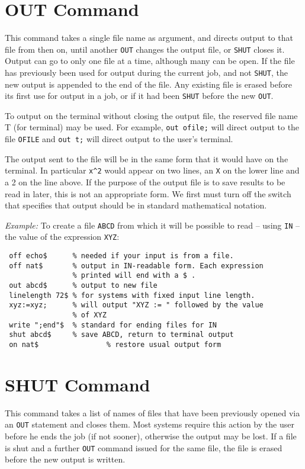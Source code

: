 \section{OUT Command}
\hypertarget{command:OUT}{}
This command takes a single file name as argument, and directs output to
that file from then on, until another \texttt{OUT} changes the output file,
or \texttt{SHUT} closes it.  Output can go to only one file at a time,
although many can be open.  If the file has previously been used for
output during the current job, and not \texttt{SHUT}, the new
output is appended to the end of the file.  Any existing file is erased
before its first use for output in a job, or if it had been \texttt{SHUT}
before the new \texttt{OUT}.

To output on the terminal without closing the output file, the reserved
file name T (for terminal) may be used.  For example,
\texttt{out ofile;} will direct output to the file \texttt{OFILE} and
\texttt{out t;} will direct output to the user's terminal.

The output sent to the file will be in the same form that it would have on
the terminal.  In particular \texttt{x\textasciicircum 2} would appear 
on two lines, an
\texttt{X} on the lower line and a 2 on the line above.  If the purpose of the
output file is to save results to be read in later, this is not an
appropriate form.  We first must turn off the  switch that
specifies that output should be in standard mathematical notation.

\textit{Example:} To create a file \texttt{ABCD} from which it will be possible
to read -- using \texttt{IN} -- the value of the expression \texttt{XYZ}:
\begin{verbatim}
 off echo$      % needed if your input is from a file.
 off nat$       % output in IN-readable form. Each expression
                % printed will end with a $ .
 out abcd$      % output to new file
 linelength 72$ % for systems with fixed input line length.
 xyz:=xyz;      % will output "XYZ := " followed by the value
                % of XYZ
 write ";end"$  % standard for ending files for IN
 shut abcd$     % save ABCD, return to terminal output
 on nat$                % restore usual output form
\end{verbatim}

\section{SHUT Command}
\hypertarget{command:SHUT}{}
This command takes a list of names of files that have been previously
opened via an \texttt{OUT} statement and closes them. Most systems require this
action by the user before he ends the {\REDUCE} job (if not sooner),
otherwise the output may be lost. If a file is shut and a further \texttt{OUT}
command issued for the same file, the file is erased before the new output
is written.

